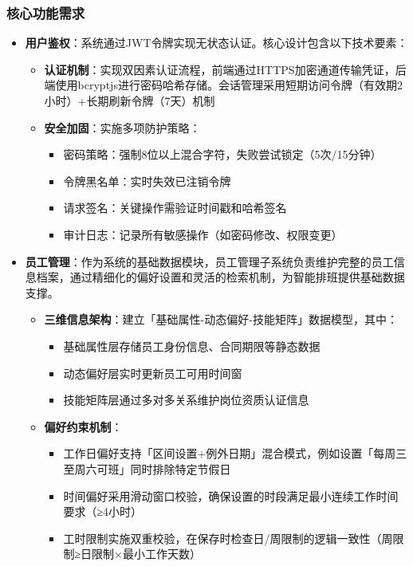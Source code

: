 \documentclass{ctexart}
\begin{document}
\subsubsection{核心功能需求}
\begin{itemize}
    \item \textbf{用户鉴权}：系统通过JWT令牌实现无状态认证。核心设计包含以下技术要素：
    \begin{itemize}
        \item \textbf{认证机制}：实现双因素认证流程，前端通过HTTPS加密通道传输凭证，后端使用bcryptjs进行密码哈希存储。会话管理采用短期访问令牌（有效期2小时）+长期刷新令牌（7天）机制
        
        \item \textbf{安全加固}：实施多项防护策略：
        \begin{itemize}
            \item 密码策略：强制8位以上混合字符，失败尝试锁定（5次/15分钟）
            \item 令牌黑名单：实时失效已注销令牌
            \item 请求签名：关键操作需验证时间戳和哈希签名
            \item 审计日志：记录所有敏感操作（如密码修改、权限变更）
        \end{itemize}
    \end{itemize}

    \item \textbf{员工管理}：作为系统的基础数据模块，员工管理子系统负责维护完整的员工信息档案，通过精细化的偏好设置和灵活的检索机制，为智能排班提供基础数据支撑。
    \begin{itemize}
        \item \textbf{三维信息架构}：建立「基础属性-动态偏好-技能矩阵」数据模型，其中：
            \begin{itemize}
                \item 基础属性层存储员工身份信息、合同期限等静态数据
                \item 动态偏好层实时更新员工可用时间窗
                \item 技能矩阵层通过多对多关系维护岗位资质认证信息
            \end{itemize}
        
        \item \textbf{偏好约束机制}：
            \begin{itemize}
                \item 工作日偏好支持「区间设置+例外日期」混合模式，例如设置「每周三至周六可班」同时排除特定节假日
                \item 时间偏好采用滑动窗口校验，确保设置的时段满足最小连续工作时间要求（≥4小时）
                \item 工时限制实施双重校验，在保存时检查日/周限制的逻辑一致性（周限制≥日限制×最小工作天数）
            \end{itemize}
        

\end{itemize}
\end{itemize}
\end{document}
